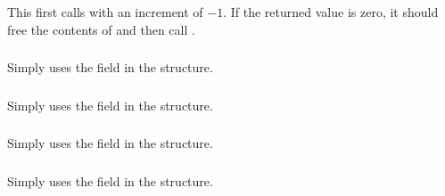 \documentclass{article}
\begin{document}
\subsubsection{}

\subsubsection{}

\subsubsection{}

\subsubsection{}

\subsubsection{}

\subsubsection{}
This first calls  with an increment of $-1$.  If
the returned value is zero, it should free the contents of  and
then call .

\subsubsection{}
Simply uses the  field in the structure.

\subsubsection{}
Simply uses the  field in the structure.

\subsubsection{}
Simply uses the  field in the structure.

\subsubsection{}
Simply uses the  field in the structure.
\end{document}
